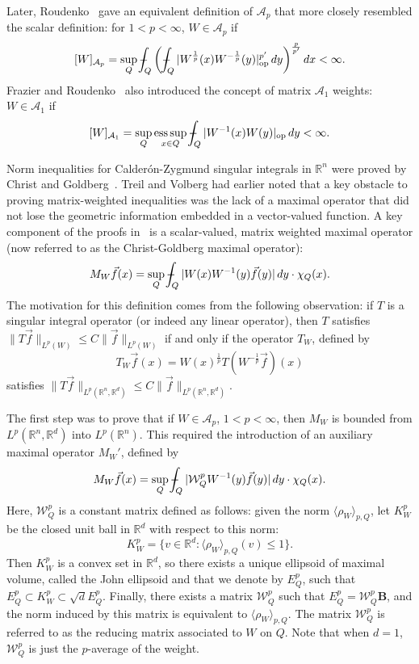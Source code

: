 \documentclass[12pt]{amsart}
\theoremstyle{definition}
\theoremstyle{remark}
\numberwithin{equation}{section}
\newcommand{\R}{\mathbb R}
\newcommand{\rn}{{{\mathbb R}^n}}
\newcommand{\rd}{{{\mathbb R}^d}}
\DeclareMathOperator*{\esssup}{ess\,sup}
\DeclareMathOperator{\op}{op}
\newcommand{\A}{\mathcal A}
\newcommand{\W}{\mathcal W}
\newcommand{\vecf}{\vec{f}}
\def\Xint#1{\mathchoice
   {\XXint\displaystyle\textstyle{#1}}%
   {\XXint\textstyle\scriptstyle{#1}}%
   {\XXint\scriptstyle\scriptscriptstyle{#1}}%
   {\XXint\scriptscriptstyle\scriptscriptstyle{#1}}%
   \!\int}
\def\XXint#1#2#3{{\setbox0=\hbox{$#1{#2#3}{\int}$}
     \vcenter{\hbox{$#2#3$}}\kern-.5\wd0}}
\def\avgint{\Xint-}
\begin{document}
Later,
Roudenko~\cite{MR1928089} gave an equivalent definition of 
$\A_p$ that more closely resembled the scalar definition:  for
$1<p<\infty$, $W\in \A_p$ if 
%
\begin{equation} \label{eqn:roudenko1}
 [W]_{\A_p} = \sup_Q \avgint_Q \bigg( \avgint_Q
    |W^{\frac{1}{p}}(x)W^{-\frac{1}{p}}(y)|_{\op}^{p'}\,dy\bigg)^{\frac{p}{p'}}\,dx <
    \infty. 
  \end{equation}
  Frazier and Roudenko~\cite{MR2104276} also introduced the concept of matrix $\A_1$
  weights:  $W\in \A_1$ if
  \begin{equation} \label{eqn:roudenko2}
  [W]_{\A_1} = \sup_Q \esssup_{x\in Q}
    \avgint_Q |W^{-1}(x)W(y)|_{\op} \,dy < \infty. 
  \end{equation}
  
Norm inequalities for   Calder\'on-Zygmund singular
integrals in $\R^n$ were proved by Christ and
Goldberg~\cite{CG,MR2015733}.  Treil and Volberg had earlier noted that a key
obstacle to proving matrix-weighted inequalities was the lack of a
maximal operator that did not lose the geometric
information embedded in a vector-valued function.  A key
component of the proofs in~\cite{CG,MR2015733} is a scalar-valued, matrix
weighted maximal operator (now referred to as the Christ-Goldberg
maximal operator):
%
\[ M_W{\vecf}(x) =
  \sup_Q \avgint_Q |W(x)W^{-1}(y){\vecf}(y)|\,dy\cdot \chi_Q(x).  \]
%
The motivation for this definition comes from the following
observation:  if $T$ is a singular integral operator (or indeed any
linear operator), then $T$ satisfies $\|T\vecf\|_{L^p(W)} \leq
C\|\vecf\|_{L^p(W)}$ if and only if the operator $T_W$, defined by
%
\[ T_W\vecf(x) = W(x)^{\frac1p}T(W^{-\frac1p}\vecf)(x) \]
%
satisfies $\|T\vecf\|_{L^p(\rn,\rd )} \leq
C\|\vecf\|_{L^p(\rn,\rd )}$.

The first step was to prove that if $W\in \A_p$, $1<p<\infty$, then $M_W$ is bounded
from  $L^p(\rn,\rd)$ into $L^p(\rn)$.  This required the introduction
of an auxiliary maximal operator $M_W'$, defined by
%
\[ M_W{\vecf}(x) =
  \sup_Q \avgint_Q |\W_Q^p W^{-1}(y){\vecf}(y)|\,dy\cdot \chi_Q(x).  \]
%
Here, $\W_Q^p$ is a constant matrix defined as follows:  given the
norm $\langle \rho_W \rangle_{p,Q}$, let $K_W^p$ be the closed unit ball
in $\rd$ with respect to this norm:
%
\[ K_W^p = \{ v \in \rd : \langle \rho_W \rangle_{p,Q}(v) \leq 1 \}. \]
%
Then $K_W^p$ is a convex set in $\rd$, so there exists a unique ellipsoid
of maximal volume, called the John ellipsoid and that we denote by
$E_Q^p$, such that $E_Q^p \subset K_W^p \subset \sqrt{d} E_Q^p$.
Finally, there exists a matrix $\W_Q^p$ such that
$E_Q^p=\W_Q^p{\mathbf B}$, and the norm induced by this matrix is
equivalent to $\langle \rho_W \rangle_{p,Q}$. 
 The matrix $\W_Q^p$ is
referred to as the reducing matrix associated to $W$ on $Q$.
Note that when $d=1$, $\W_Q^p$  is just the $p$-average of the
weight.
\end{document}
